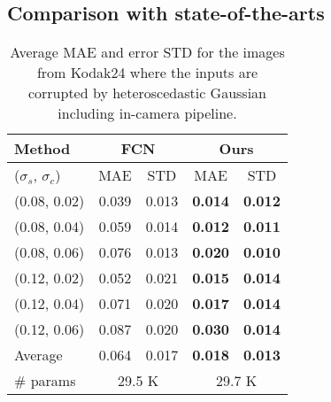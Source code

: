 \documentclass[10pt,twocolumn,letterpaper]{article}
\begin{document}
\subsection{Comparison with state-of-the-arts}
\begin{table}[]
	\centering
	\caption{Average MAE and error STD for the images from Kodak24 where the inputs are corrupted by heteroscedastic Gaussian including in-camera pipeline. }
	\label{table:estimator}
	\begin{adjustbox}{width=0.6\linewidth}
		\begin{tabular}{l|cc|cc}
			\toprule
			Method   & \multicolumn{2}{c|}{FCN} & \multicolumn{2}{c}{Ours} \\
			\hline 
			($\sigma_s$, $\sigma_c$) & MAE        & STD        & MAE           & STD          \\
			\hline \hline
			(0.08, 0.02)     & 0.039      & 0.013      & \textbf{0.014}         & \textbf{0.012}        \\
			(0.08, 0.04)     & 0.059      & 0.014      & \textbf{0.012}         & \textbf{0.011}        \\
			(0.08, 0.06)     & 0.076      & 0.013      & \textbf{0.020}         & \textbf{0.010}        \\
			(0.12, 0.02)     & 0.052      & 0.021      & \textbf{0.015}         & \textbf{0.014}        \\
			(0.12, 0.04)     & 0.071      & 0.020      & \textbf{0.017}         & \textbf{0.014}        \\
			(0.12, 0.06)     & 0.087      & 0.020      & \textbf{0.030}         & \textbf{0.014}        \\
			\hline
			Average & 0.064 & 0.017& \textbf{0.018}& \textbf{0.013}\\
			\hline
			\# params & \multicolumn{2}{c|}{29.5 K} & \multicolumn{2}{c}{29.7 K} \\			
			\bottomrule			
		\end{tabular}
	\end{adjustbox}
\end{table}
\end{document}
